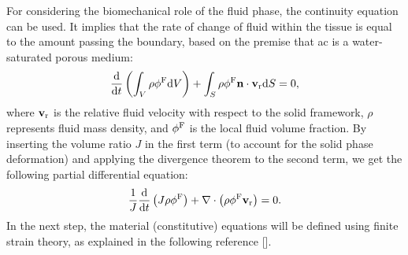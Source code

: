 For considering the biomechanical role of the fluid phase, the continuity equation can be used. It implies that the rate of change of fluid within the tissue is equal to the amount passing the boundary, based on the premise that \ac{ac} is a water-saturated porous medium:
%
\begin{equation}
    \frac{{\rm d}}{{\rm d}t}\left ( \int_V \rho \phi^{\rm F} {\rm d}V \right ) + \int_S \rho \phi^{\rm F} \textbf{n} \cdot \textbf{v}_{\rm r} {\rm d}S = 0,
\end{equation}
%
where $\textbf{v}_{\rm r}$ is the relative fluid velocity with respect to the solid framework, $\rho$ represents fluid mass density, and $\phi^{\rm F}$ is the local fluid volume fraction. By inserting the volume ratio $J$ in the first term (to account for the solid phase deformation) and applying the divergence theorem to the second term, we get the following partial differential equation:
%
\begin{equation}\label{eq-pde}
    \frac{1}{J}\frac{{\rm d}}{{\rm d}t}\left (J\rho \phi^{\rm F} \right ) + \nabla \cdot \left ( \rho \phi^{\rm F} \textbf{v}_{\rm r} \right ) = 0.
\end{equation}
%
In the next step, the material (constitutive) equations will be defined using finite strain theory, as explained in the following reference [\cite{gerhard-book}].

